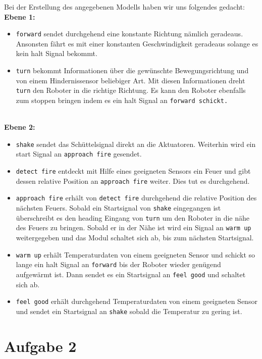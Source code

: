 \documentclass{../Vorlage/mat}
\begin{document}
Bei der Erstellung des angegebenen Modells haben wir uns folgendes gedacht:\\
\textbf{Ebene 1:}\\
\begin{itemize}
	\item \texttt{forward} sendet durchgehend eine konstante Richtung nämlich geradeaus. Ansonsten fährt es mit einer konstanten Geschwindigkeit geradeaus solange es kein halt Signal bekommt.
	\item \texttt{turn} bekommt Informationen über die gewünschte Bewegungsrichtung und von einem Hindernissensor beliebiger Art. Mit diesen Informationen dreht \texttt{turn} den Roboter in die richtige Richtung. Es kann den Roboter ebenfalls zum stoppen bringen indem es ein halt Signal an \texttt{forward schickt.}
\end{itemize}
\\
\textbf{Ebene 2:}
\begin{itemize}
	\item \texttt{shake} sendet das Schüttelsignal direkt an die Aktuatoren. Weiterhin wird ein start Signal an \texttt{approach fire} gesendet.
	\item \texttt{detect fire} entdeckt mit Hilfe eines geeigneten Sensors ein Feuer und gibt dessen relative Position an \texttt{approach fire} weiter. Dies tut es durchgehend.
	\item \texttt{approach fire} erhält von \texttt{detect fire} durchgehend die relative Position des nächsten Feuers. Sobald ein Startsignal von \texttt{shake} eingegangen ist überschreibt es den heading Eingang von \texttt{turn} um den Roboter in die nähe des Feuers zu bringen. Sobald er in der Nähe ist wird ein Signal an \texttt{warm up} weitergegeben und das Modul schaltet sich ab, bis zum nächsten Startsignal.
	\item \texttt{warm up} erhält Temperaturdaten von einem geeigneten Sensor und schickt so lange ein halt Signal an \texttt{forward} bis der Roboter wieder genügend aufgewärmt ist. Dann sendet es ein Startsignal an \texttt{feel good} und schaltet sich ab.
	\item \texttt{feel good} erhält durchgehend Temperaturdaten von einem geeigneten Sensor und sendet ein Startsignal an \texttt{shake} sobald die Temperatur zu gering ist.
\end{itemize}


\section*{Aufgabe 2}
\end{document}
